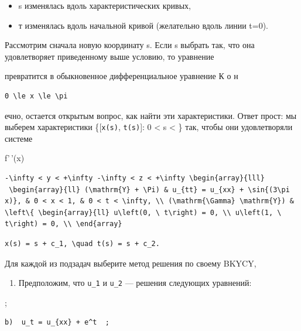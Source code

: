 \documentclass[
  ukrainian,
]{article}
\providecommand{\tightlist}{%
  \setlength{\itemsep}{0pt}\setlength{\parskip}{0pt}}
\begin{document}
\begin{itemize}
\tightlist
\item
  s изменялась вдоль характеристических кривых,
\item
  т изменялась вдоль начальной кривой (желательно вдоль линии t=0).
\end{itemize}

Рассмотрим сначала новую координату s. Если s выбрать так, что она
удовлетворяет приведенному выше условию, то уравнение

превратится в обыкновенное дифференциальное уравнение К о н

\begin{verbatim}
0 \le x \le \pi
\end{verbatim}

ечно, остается открытым вопрос, как найти эти характеристики. Ответ
прост: мы выберем характеристики \{{[}\texttt{x(s)}, \texttt{t(s)}{]}: 0
\textless{} s \textless{} \infty\} так, чтобы они удовлетворяли системе

f'\,'(x)

\begin{verbatim}
-\infty < y < +\infty -\infty < z < +\infty \begin{array}{lll}
 \begin{array}{ll} (\mathrm{Y} + \Pi) & u_{tt} = u_{xx} + \sin{(3\pi x)}, & 0 < x < 1, & 0 < t < \infty, \\ (\mathrm{\Gamma} \mathrm{Y}) & \left\{ \begin{array}{ll} u\left(0, \ t\right) = 0, \\ u\left(1, \ t\right) = 0, \\ \end{array}
\end{verbatim}

\begin{verbatim}
x(s) = s + c_1, \quad t(s) = s + c_2.
\end{verbatim}

Для каждой из подзадач выберите метод решения по своему BKYCY,

\begin{enumerate}
\def\labelenumi{\arabic{enumi}.}
\setcounter{enumi}{2}
\tightlist
\item
  Предположим, что \texttt{u\_1} и \texttt{u\_2} --- решения следующих
  уравнений:
\end{enumerate}

;

\begin{verbatim}
b)  u_t = u_{xx} + e^t  ;
\end{verbatim}
\end{document}
